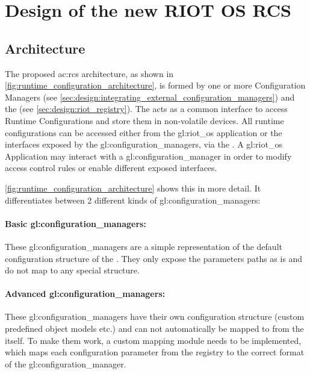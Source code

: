 \chapter{Design of the new RIOT OS RCS}
\label{chapter:design}

\section{Architecture}
\label{sec:design:architecture}

The proposed \gls{ac:rcs} architecture, as shown in \autoref{fig:runtime_configuration_architecture}, is formed by one or more Configuration
Managers (see \autoref{sec:design:integrating_external_configuration_managers}) and the  (see \autoref{sec:design:riot_registry}).
The  acts as a common interface to access Runtime Configurations and store them in non-volatile devices.
All runtime configurations can be accessed either from the \gls{gl:riot_os} application or the interfaces exposed by the \glspl{gl:configuration_manager}, via the .
A \gls{gl:riot_os} Application may interact with a \gls{gl:configuration_manager} in order to modify access control rules or enable different exposed interfaces.

\autoref{fig:runtime_configuration_architecture} shows this in more detail.
It differentiates between 2 different kinds of \glspl{gl:configuration_manager}:

\subsubsection{Basic \glspl*{gl:configuration_manager}:}
These \glspl{gl:configuration_manager} are a simple representation of the default configuration structure of the .
They only expose the parameters paths as is and do not map to any special structure.

\subsubsection{Advanced \glspl*{gl:configuration_manager}:}
These \glspl{gl:configuration_manager} have their own configuration structure (custom predefined object models etc.) and can not automatically be mapped to from the  itself.
To make them work, a custom mapping module needs to be implemented, which maps each configuration parameter from the registry to the correct format of the \gls{gl:configuration_manager}.

